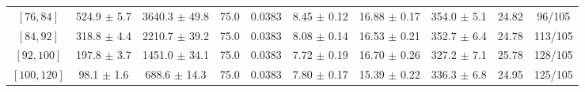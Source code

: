\begin{tabular}{c||c|c|c|c|c|c|c||c|c}
$[76, 84]$ & 524.9 $\pm$ 5.7 & 3640.3 $\pm$ 49.8 & 75.0 & 0.0383 & 8.45 $\pm$ 0.12 & 16.88 $\pm$ 0.17 & 354.0 $\pm$ 5.1 & 24.82 & 96/105\\
$[84, 92]$ & 318.8 $\pm$ 4.4 & 2210.7 $\pm$ 39.2 & 75.0 & 0.0383 & 8.08 $\pm$ 0.14 & 16.53 $\pm$ 0.21 & 352.7 $\pm$ 6.4 & 24.78 & 113/105\\
$[92, 100]$ & 197.8 $\pm$ 3.7 & 1451.0 $\pm$ 34.1 & 75.0 & 0.0383 & 7.72 $\pm$ 0.19 & 16.70 $\pm$ 0.26 & 327.2 $\pm$ 7.1 & 25.78 & 128/105\\
$[100, 120]$ & 98.1 $\pm$ 1.6 & 688.6 $\pm$ 14.3 & 75.0 & 0.0383 & 7.80 $\pm$ 0.17 & 15.39 $\pm$ 0.22 & 336.3 $\pm$ 6.8 & 24.95 & 125/105\\
\end{tabular}
